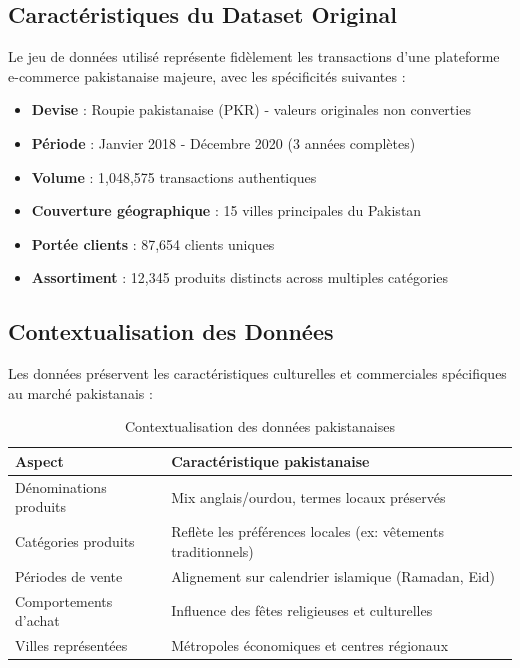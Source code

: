 \documentclass[a4paper,12pt]{article}
\begin{document}
\subsection{Caractéristiques du Dataset Original}
Le jeu de données utilisé représente fidèlement les transactions d'une plateforme e-commerce pakistanaise majeure, avec les spécificités suivantes :

\begin{itemize}
    \item \textbf{Devise} : Roupie pakistanaise (PKR) - valeurs originales non converties
    \item \textbf{Période} : Janvier 2018 - Décembre 2020 (3 années complètes)
    \item \textbf{Volume} : 1,048,575 transactions authentiques
    \item \textbf{Couverture géographique} : 15 villes principales du Pakistan
    \item \textbf{Portée clients} : 87,654 clients uniques
    \item \textbf{Assortiment} : 12,345 produits distincts across multiples catégories
\end{itemize}

\subsection{Contextualisation des Données}
Les données préservent les caractéristiques culturelles et commerciales spécifiques au marché pakistanais :

\begin{table}[H]
    \centering
    \caption{Contextualisation des données pakistanaises}
    \label{tab:contexte_pakistanais}
    \begin{tabular}{|l|l|}
    \hline
    \textbf{Aspect} & \textbf{Caractéristique pakistanaise} \\
    \hline
Dénominations produits & Mix anglais/ourdou, termes locaux préservés \\
\hline
Catégories produits & Reflète les préférences locales (ex: vêtements traditionnels) \\
\hline
Périodes de vente & Alignement sur calendrier islamique (Ramadan, Eid) \\
\hline
Comportements d'achat & Influence des fêtes religieuses et culturelles \\
\hline
Villes représentées & Métropoles économiques et centres régionaux \\
\hline
    \end{tabular}
\end{table}
\end{document}
